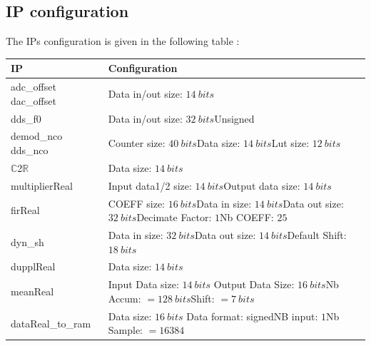 \documentclass[12pt,oneside]{article}
\begin{document}
\subsection{IP configuration}
The IPs configuration is given in the following table :

\begin{center}
	\begin{tabular}{|>{\centering\arraybackslash}m{.3\linewidth} | >{\centering\arraybackslash}m{.3\linewidth} |}
		\hline
		IP & Configuration \\
		\hline
		\hspace{0.65cm} adc\_offset \newline dac\_offset&Data in/out size: $14~bits$\\
		\hdashline
		dds\_f0& Data in/out size: $32~bits$\newline Unsigned\\
		\hline
		\hspace{0.55cm} demod\_nco \newline dds\_nco & Counter size: $40~bits$\newline Data size: $14~bits$\newline Lut size: $12~bits$\\
		\hline
		$\mathbb{C}$2$\mathbb{R}$& Data size: $14~bits$\\
		\hline
		multiplierReal& Input data1/2 size: $14~bits$\newline Output data size: $14~bits$\\
		\hline
		firReal& COEFF size: $16~bits$\newline Data in size: $14~bits$\newline Data out size: $32~bits$\newline Decimate Factor: $1$\newline Nb COEFF: $25$\\
		\hline
		dyn\_sh& Data in size: $32~bits$\newline Data out size: $14~bits$\newline Default Shift: $18~bits$\\
		\hline
		dupplReal& Data size: $14~bits$\\
		\hline
		meanReal&Input Data size: $14~bits$ \newline Output Data Size: $16~bits$\newline Nb Accum: $=128~bits$\newline Shift: $=7~bits$\\
		\hline
		dataReal\_to\_ram&Data size: $16~bits$ \newline Data format: signed\newline NB input: $1$\newline Nb Sample: $=16384$\\
		\hline
		\end{tabular}


\end{center}
\end{document}
